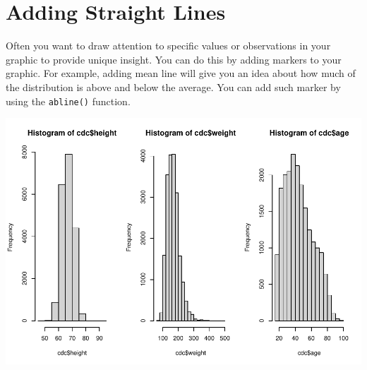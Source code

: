\documentclass[
]{book}
\newenvironment{Shaded}{\begin{snugshade}}{\end{snugshade}}
\newcommand{\CommentTok}[1]{\textcolor[rgb]{0.56,0.35,0.01}{\textit{#1}}}
\newcommand{\DataTypeTok}[1]{\textcolor[rgb]{0.13,0.29,0.53}{#1}}
\newcommand{\DecValTok}[1]{\textcolor[rgb]{0.00,0.00,0.81}{#1}}
\newcommand{\KeywordTok}[1]{\textcolor[rgb]{0.13,0.29,0.53}{\textbf{#1}}}
\newcommand{\NormalTok}[1]{#1}
\newcommand{\OperatorTok}[1]{\textcolor[rgb]{0.81,0.36,0.00}{\textbf{#1}}}
\newcommand{\StringTok}[1]{\textcolor[rgb]{0.31,0.60,0.02}{#1}}
\begin{document}
\hypertarget{adding-straight-lines}{%
\section{Adding Straight Lines}\label{adding-straight-lines}}

Often you want to draw attention to specific values or observations in your graphic to provide unique insight. You can do this by adding markers to your graphic. For example, adding mean line will give you an idea about how much of the distribution is above and below the average. You can add such marker by using the \texttt{abline()} function.

\begin{Shaded}
\end{Shaded}

\includegraphics{_main_files/figure-latex/unnamed-chunk-239-1.pdf}
\end{document}
